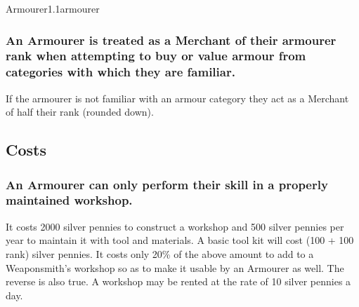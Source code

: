 \begin{skill}{Armourer}{1.1}{armourer}
\subsubsection{An Armourer is treated as a Merchant of their armourer
rank when attempting to buy or value armour from categories with
which they are familiar.}

If the armourer is not familiar with an armour category they act as a
Merchant of half their rank (rounded down).

\subsection{Costs}

\subsubsection{An Armourer can only perform their skill in a properly
maintained workshop.}

It costs 2000 silver pennies to construct a workshop and 500 silver
pennies per year to maintain it with tool and materials.  A basic tool
kit will cost (100 + 100 \x rank) silver pennies.  It costs only 20\%
of the above amount to add to a Weaponsmith's workshop so as to make
it usable by an Armourer as well.  The reverse is also true.  A
workshop may be rented at the rate of 10 silver pennies a day.

\end{skill}
